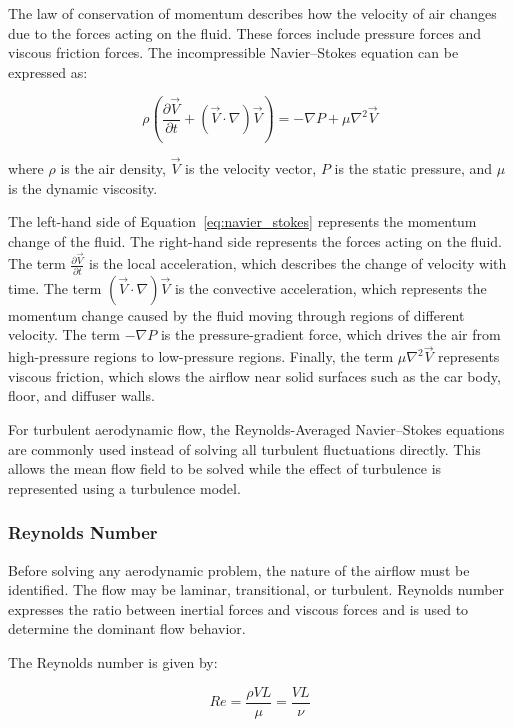 \documentclass[12pt,a4paper]{article}
\begin{document}
The law of conservation of momentum describes how the velocity of air changes due to
the forces acting on the fluid. These forces include pressure forces and viscous friction
forces. The incompressible Navier--Stokes equation can be expressed as:

\begin{equation}
    \rho \left(
    \frac{\partial \vec{V}}{\partial t}
    +
    (\vec{V} \cdot \nabla)\vec{V}
    \right)
    =
    -\nabla P
    +
    \mu \nabla^2 \vec{V}
    \label{eq:navier_stokes}
\end{equation}

where $\rho$ is the air density, $\vec{V}$ is the velocity vector, $P$ is the static pressure,
and $\mu$ is the dynamic viscosity.

The left-hand side of Equation~\ref{eq:navier_stokes} represents the momentum change
of the fluid. The right-hand side represents the forces acting on the fluid. The term
$\frac{\partial \vec{V}}{\partial t}$ is the local acceleration, which describes the change
of velocity with time. The term $(\vec{V} \cdot \nabla)\vec{V}$ is the convective acceleration,
which represents the momentum change caused by the fluid moving through regions of
different velocity. The term $-\nabla P$ is the pressure-gradient force, which drives the
air from high-pressure regions to low-pressure regions. Finally, the term
$\mu \nabla^2 \vec{V}$ represents viscous friction, which slows the airflow near solid
surfaces such as the car body, floor, and diffuser walls.

For turbulent aerodynamic flow, the Reynolds-Averaged Navier--Stokes equations are
commonly used instead of solving all turbulent fluctuations directly. This allows the
mean flow field to be solved while the effect of turbulence is represented using a
turbulence model.

\subsubsection{Reynolds Number}

Before solving any aerodynamic problem, the nature of the airflow must be identified.
The flow may be laminar, transitional, or turbulent. Reynolds number expresses the ratio
between inertial forces and viscous forces and is used to determine the dominant flow
behavior.

The Reynolds number is given by:

\begin{equation}
    Re = \frac{\rho V L}{\mu} = \frac{V L}{\nu} \label{eq:reynolds}
\end{equation}
\end{document}
